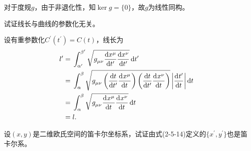 \begin{xiti}
\begin{zm}
        对于度规$g$，由于非退化性，知$\ker g=\{0\}$，故$g$为线性同构。
    \end{zm}
    
    \item 试证线长与曲线的参数化无关。
    
    \begin{zm}
    	设有重参数化$C^\prime(t^\prime)=C(t)$，线长为
    	\begin{align*}
    	\allowdisplaybreaks
    	l^\prime=&\;\int_{\alpha^\prime}^{\beta^\prime} \sqrt{\tensor{g}{_\mu_\nu} \dv{x^\mu}{t^\prime}\dv{x^\nu}{t^\prime} }\dd{t^\prime}\\
    	=&\;\int_{\alpha}^{\beta} \sqrt{\tensor{g}{_\mu_\nu} \left(\dv{t}{t^\prime}\dvt{x^\mu} \right)\left( \dv{t}{t^\prime}\dvt{x^\nu} \right) }\left| \dvt{t^\prime} \right|\dd{t}\\
    	=&\;\int_{\alpha}^{\beta} \sqrt{\tensor{g}{_\mu_\nu}\dvt{x^\mu}\dvt{x^\nu} }\dd{t}\\
    	=&\;l.
    	\end{align*}
    \end{zm}
    
    \item 设$(x,y)$是二维欧氏空间的笛卡尔坐标系，试证由式(2-5-14)定义的$\{x^\prime,y^\prime \}$也是笛卡尔系。
    

\end{xiti}
